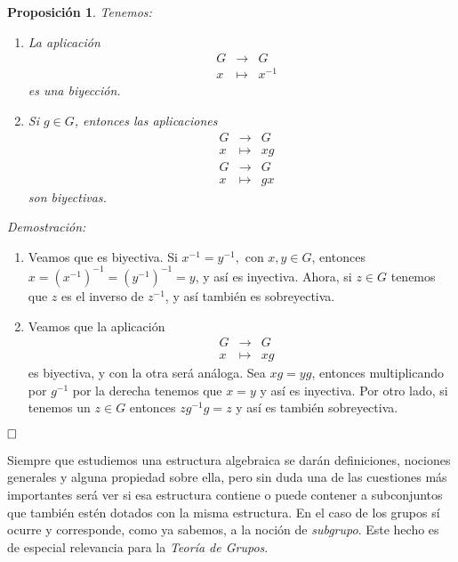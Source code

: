 \documentclass[12pt]{article}
\newtheorem{proposition}[theorem]{Proposición}
\begin{document}
\begin{proposition}\label{biyeG} Tenemos: \begin{enumerate}
\item La aplicación $$\begin{array}{rccl}
&G&\longrightarrow &G\\
&x&\longmapsto &x^{-1}
\end{array}$$ es una biyección. 
\item Si $g \in G$, entonces las aplicaciones $$\begin{array}{rccl}
&G&\longrightarrow &G\\
&x&\longmapsto &xg
\end{array}$$
$$\begin{array}{rccl}
&G&\longrightarrow &G\\
&x&\longmapsto &gx
\end{array}$$
son biyectivas.
\end{enumerate}
\end{proposition}
\emph{Demostración: } \begin{enumerate} 
\item Veamos que es biyectiva. Si $x^{-1} = y^{-1},$ con $x,y \in G$, entonces $x = (x^{-1})^{-1} = (y^{-1})^{-1} = y$, y así es inyectiva. Ahora, si $z \in G$ tenemos que $z$ es el inverso de $z^{-1}$, y así también es sobreyectiva.
\item Veamos que la aplicación $$\begin{array}{rccl}
&G&\longrightarrow &G\\
&x&\longmapsto &xg
\end{array}$$ es biyectiva, y con la otra será análoga. Sea $xg = yg$, entonces multiplicando por $g^{-1}$ por la derecha tenemos que $x = y$ y así es inyectiva. Por otro lado, si tenemos un $z \in G$ entonces $zg^{-1}g = z$ y así es también sobreyectiva.

\end{enumerate}

$\hfill \square$

Siempre que estudiemos una estructura algebraica se darán definiciones, nociones generales y alguna propiedad sobre ella, pero sin duda una de las cuestiones más importantes será ver si esa estructura contiene o puede contener a subconjuntos que también estén dotados con la misma estructura. En el caso de los grupos sí ocurre y corresponde, como ya sabemos, a la noción de \textit{subgrupo}. Este hecho es de especial relevancia para la \textit{Teoría de Grupos}.
\end{document}
